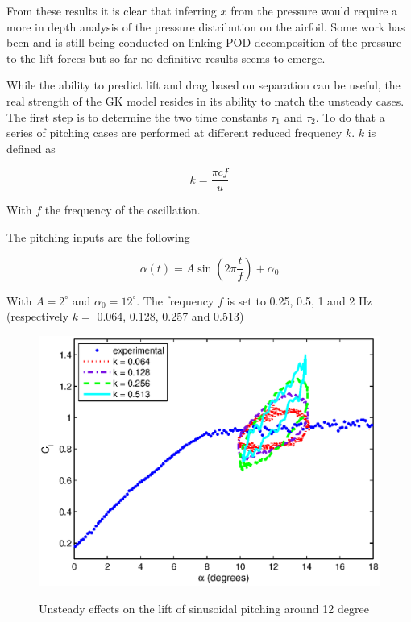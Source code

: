 \par From these results it is clear that inferring $x$ from the pressure would require a more in depth analysis of the pressure distribution on the airfoil.
Some work has been and is still being conducted on linking POD decomposition of the pressure to the lift forces but so far no definitive results seems to emerge.



While the ability to predict lift and drag based on separation can be useful, the real strength of the GK model resides in its ability to match the unsteady cases.
The first step is to determine the two time constants $\tau_1$ and $\tau_2$. 
To do that a series of pitching cases are performed at different reduced frequency $k$.
$k$ is defined as

\begin{equation}
  k=\frac{\pi c f}{u}
\end{equation}

With $f$ the frequency of the oscillation.

\par The pitching inputs are the following

\begin{equation}
	\alpha\left( t \right)= A \sin \left( 2 \pi \frac{t}{f} \right) + \alpha_0
	\label{eqn:pitch_input}
\end{equation}

With $A=2^\circ$ and $\alpha_0=12^\circ$.
The frequency $f$ is set to 0.25, 0.5, 1 and 2 Hz (respectively $k =$ 0.064, 0.128, 0.257 and 0.513)

\begin{figure}[h]
  \begin{center}
    \scalebox{0.9}  
    {\includegraphics{./Figures/Pitching_allcases_CL_12_amp_2.eps}}
  \end{center}
  \caption{Unsteady effects on the lift of sinusoidal pitching around 12 degree} 
  \label{fig:Pitching_allcases_Cl_12}
\end{figure}

